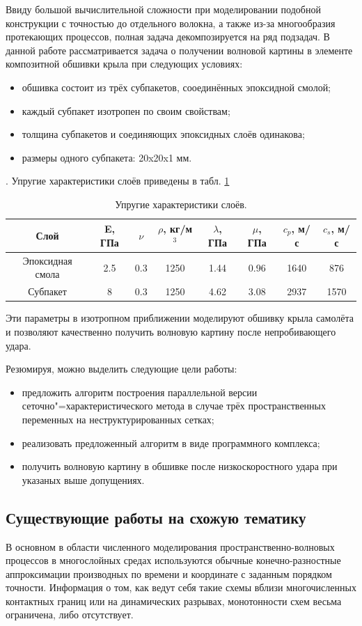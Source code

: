Ввиду большой вычислительной сложности при моделировании подобной конструкции с 
точностью до отдельного волокна, а также из-за многообразия протекающих процессов, 
полная задача декомпозируется на ряд подзадач. В данной работе рассматривается задача о получении
волновой картины в элементе композитной обшивки крыла при следующих условиях:
\begin{itemize}
\item обшивка состоит из трёх субпакетов, сооединённых эпоксидной смолой;
\item каждый субпакет изотропен по своим свойствам;
\item толщина субпакетов и соединяющих эпоксидных слоёв одинакова;
\item размеры одного субпакета: 20x20x1 мм.
\end{itemize}.
Упругие характеристики слоёв приведены в табл. \ref{tbl:subpackage}
\begin{table}
\centering
\begin{tabular}{|c|c|c|c|c|c|c|c|}
\hline
Слой & E, ГПа & $\nu$ & $\rho$, кг/м$^{3}$ & $\lambda$, ГПа & $\mu$, ГПа &
$c_p$, м/с & $c_s$, м/с \\
\hline
Эпоксидная смола & 2.5 & 0.3 & 1250 & 1.44 & 0.96 & 1640 & 876 \\
Субпакет & 8 & 0.3 & 1250 & 4.62 & 3.08 & 2937 & 1570 \\
\hline
\end{tabular}
\caption{Упругие характеристики слоёв.}
\label{tbl:subpackage}
\end{table}
Эти параметры в изотропном приближении моделируют обшивку крыла самолёта и
позволяют качественно получить волновую картину после непробивающего удара.

Резюмируя, можно выделить следующие цели работы:
\begin{itemize}
\item предложить алгоритм построения параллельной версии сеточно"=характеристического метода в случае трёх пространственных переменных на неструктурированных сетках;
\item реализовать предложенный алгоритм в виде программного комплекса;
\item получить волновую картину в обшивке после низкоскоростного удара при
указаных выше допущениях.
\end{itemize}

\subsection*{Существующие работы на схожую тематику}
В основном в области численного моделирования пространственно-волновых процессов в многослойных средах используются обычные конечно-разностные аппроксимации производных по времени и координате с заданным порядком точности. Информация о том, как ведут себя такие схемы вблизи многочисленных контактных границ или на динамических разрывах, монотонности схем весьма ограничена, либо отсутствует.

